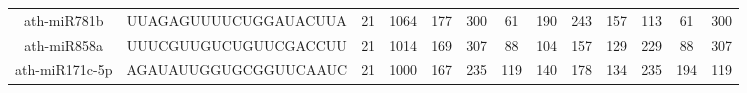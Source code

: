 \begin{landscape}
\begin{table}[]
\begin{tabular}{ccccccccccccc}
    ath-miR781b      & UUAGAGUUUUCUGGAUACUUA    & 21           & 1064         & 177              & 300          & 61                           & 190                  & 243                  & 157                   & 113                   & 61                    & 300                   \\
    ath-miR858a      & UUUCGUUGUCUGUUCGACCUU    & 21           & 1014         & 169              & 307          & 88                           & 104                  & 157                  & 129                   & 229                   & 88                    & 307                   \\
    ath-miR171c-5p   & AGAUAUUGGUGCGGUUCAAUC    & 21           & 1000         & 167              & 235          & 119                          & 140                  & 178                  & 134                   & 235                   & 194                   & 119                  
    \end{tabular}
    \end{table}
\end{landscape}
